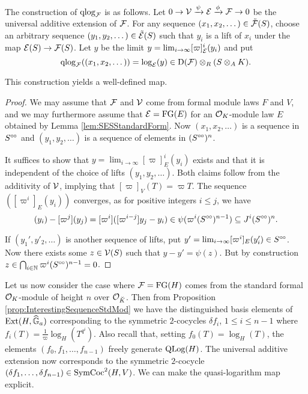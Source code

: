 \documentclass[../main.tex]{subfiles}
\begin{document}
The construction of $\mathrm{qlog}_{\mathcal{F}}$ is as follows.  
Let $0 \to \mathcal{V} \xrightarrow{\psi} \mathcal{E} \xrightarrow{\phi} \mathcal{F} \to 0$ be the universal additive
extension of $\mathcal{F}$. For any sequence $(x_1, x_2, \dots) \in \tilde {\mathcal{F}}(S)$, choose an arbitrary sequence $(y_1, y_2, \dots) \in
\tilde {\mathcal{E}}(S)$ such that $y_i$ is a lift of $x_i$ under the map $\mathcal{E}(S) \to \mathcal{F}(S)$. 
Let $y$ be the limit $y = \lim_{i \to \infty} [\varpi]_{\mathcal{E}}^i(y_i)$ and put 
$$\mathrm{qlog}_{\mathcal{F}}((x_1, x_2, \dots)) = \log_{\mathcal{E}}(y) \in \mathrm{D}(\mathcal{F}) \otimes_R(S \otimes_A K).$$ 

\begin{prop}
  This construction yields a well-defined map. 
\begin{proof}
  We may assume that $\mathcal{F}$ and $\mathcal{V}$ come from formal module laws $F$ and 
  $V$, and we may furthermore assume that $\mathcal{E} = \textnormal{FG}(E)$ 
  for an $\mathcal{O}_K$-module law $E$ obtained by Lemma \ref{lem:SESStandardForm}. Now
  $(x_1, x_2, \dots)$ is a sequence in $S^{\circ \hspace{-0.5pt} \circ}$ and $(y_1, y_2, \dots)$ is a
  sequence of elements in $(S^{\circ \hspace{-0.5pt} \circ})^n$.

  It suffices to show that $y = \lim_{i\to \infty} [\varpi]^i_E(y_i)$ exists and 
  that it is independent of the choice of lifts $(y_1, y_2, \dots)$. 
  Both claims follow from the additivity of $\mathcal{V}$, implying that 
  $[\varpi]_{V}(T) = \varpi T$. The sequence 
  $([\varpi^i]_{E}(y_i))$ converges, as for positive integers $i\leq j$, we have 
  \begin{equation*}
    [\varpi^i](y_i) - [\varpi^j](y_j) = [\varpi^i]([\varpi^{i-j}]y_j - y_i)
    \in \psi(\varpi^i (S^\cici)^{n-1}) \subseteq J^i (S^\cici)^{n}. 
  \end{equation*}

  If $(y_1', y'_2, \dots)$ is another sequence of lifts, put
  $y' = \lim_{i \to \infty} [\varpi^i]_E (y_i') \in S^{\circ \hspace{-0.5pt} \circ}$. Now there exists some
  $z \in \mathcal{V}(S)$ such that 
  $y - y' = \psi(z)$. But by construction
  $z \in \bigcap_{i \in \mathbb{N}} \varpi^i(S^{{\circ \hspace{-0.5pt} \circ}})^{n-1} = 0$.
\end{proof}
\end{prop}

Let us now consider the case where $\mathcal{F} = \textnormal{FG}(H)$ comes from the standard
formal $\mathcal{O}_K$-module of height $n$ over $\mathcal{O}_{\breve K}$. Then 
from Proposition \ref{prop:InterestingSequenceStdMod} we have the distinguished
basis elements of $\operatorname{Ext}(H,\widehat{\mathbb{G}}_a)$ corresponding to the symmetric $2$-cocycles
$\delta f_i$, $1 \leq i \leq n-1$ where $f_i(T) = \frac 1 \varpi
\log_H(T^{q^i})$. Also recall that, setting $f_0(T) = \log_H(T)$, the elements 
$(f_0, f_1, \dots, f_{n-1})$ freely generate $\operatorname {QLog}(H)$. The universal
additive extension now corresponds to the symmetric $2$-cocycle $(\delta f_1,
\dots, \delta f_{n-1}) \in \operatorname{SymCoc}^2(H,V)$.
We can make the quasi-logarithm map explicit.
\end{document}
